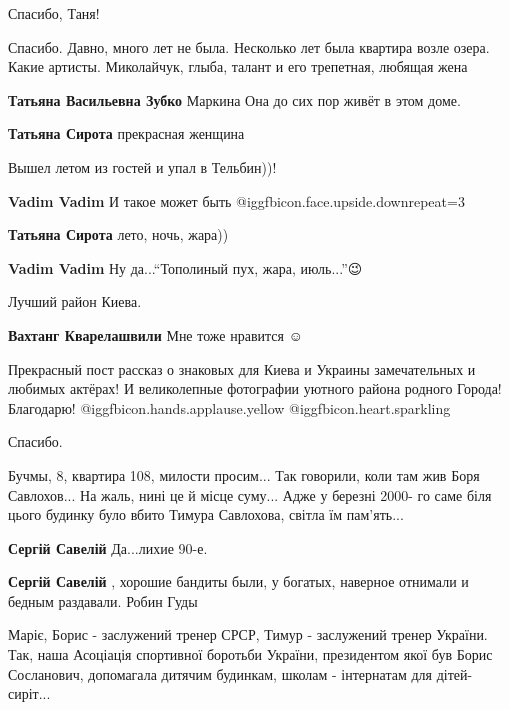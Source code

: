 \begin{itemize}
Спасибо, Таня!


Спасибо. Давно, много лет не была. Несколько лет была квартира возле озера.
Какие артисты. Миколайчук, глыба, талант и его трепетная, любящая жена

\begin{itemize} %
\textbf{Татьяна Васильевна Зубко} Маркина Она до сих пор живёт в этом доме.

\textbf{Татьяна Сирота} прекрасная женщина
\end{itemize} %

Вышел летом из гостей и упал в Тельбин))!

\begin{itemize} %
\textbf{Vadim Vadim} И такое может быть @igg{fbicon.face.upside.down}{repeat=3} 

\textbf{Татьяна Сирота} лето, ночь, жара))

\textbf{Vadim Vadim} Ну да...\enquote{Тополиный пух, жара, июль...}😉
\end{itemize} %

Лучший район Киева.

\textbf{Вахтанг Кварелашвили} Мне тоже нравится ☺ ️ 


Прекрасный пост рассказ о знаковых для Киева и Украины замечательных и любимых
актёрах! И великолепные фотографии уютного района родного Города! Благодарю!
 @igg{fbicon.hands.applause.yellow}  @igg{fbicon.heart.sparkling} 

Спасибо.


Бучмы, 8, квартира 108, милости просим... Так говорили, коли там жив Боря
Савлохов... На жаль, нині це й місце суму... Адже у березні 2000- го саме біля
цього будинку було вбито Тимура Савлохова, світла їм пам'ять...

\begin{itemize} %
\textbf{Сергій Савелій} Да...лихие 90-е.

\textbf{Сергій Савелій} , хорошие бандиты были, у богатых, наверное отнимали и бедным раздавали. Робин Гуды

Маріє, Борис - заслужений тренер СРСР, Тимур - заслужений тренер України. Так,
наша Асоціація спортивної боротьби України, президентом якої був Борис
Сосланович, допомагала дитячим будинкам, школам - інтернатам для дітей-
сиріт...


\end{itemize}
\end{itemize}
